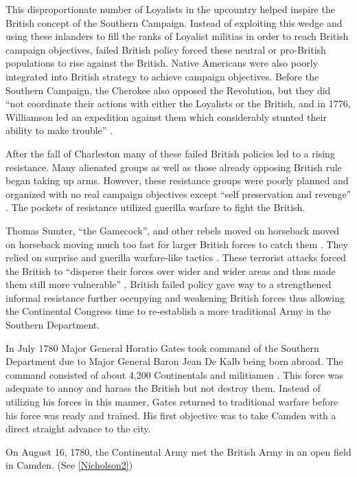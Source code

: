 This disproportionate number of Loyalists in the upcountry helped inspire the
British concept of the Southern Campaign.  Instead of exploiting this wedge and
using these inlanders to fill the ranks of Loyalist militias in order to reach
British campaign objectives, failed British policy forced these neutral or
pro-British populations to rise against the British.  Native Americans were also
poorly integrated into British strategy to achieve campaign objectives.  Before
the Southern Campaign, the Cherokee also opposed the Revolution, but they did
“not coordinate their actions with either the Loyalists or the British, and in
1776, Williamson led an expedition against them which considerably stunted their
ability to make trouble” \cite[p.12]{weigley_partisan_1970}.

After the fall of Charleston many of these failed British policies led to a
rising resistance.  Many alienated groups as well as those already opposing
British rule began taking up arms.  However, these resistance groups were poorly
planned and organized with no real campaign objectives except  “self
preservation and revenge” \cite[p.14]{weigley_partisan_1970}.  The pockets of resistance utilized
guerilla warfare to fight the British.  

Thomas Sumter, “the Gamecock”, and other rebels moved on horseback moved on
horseback moving much too fast for larger British forces to catch them
\cite[p.15]{weigley_partisan_1970}.  They relied on surprise and guerilla warfare-like tactics
\cite[p.15]{weigley_partisan_1970}.  These terrorist attacks forced the British to “disperse
their forces over wider and wider areas and thus made them still more
vulnerable” \cite[p.16]{weigley_partisan_1970}.  British failed policy gave way to a
strengthened informal resistance further occupying and weakening British forces
thus allowing the Continental Congress time to re-establish a more traditional
Army in the Southern
Department.

In July 1780 Major General Horatio Gates took command of the Southern Department
due to Major General Baron Jean De Kalb being born abroad.  The command
consisted of about 4,200 Continentals and militiamen \cite[p.21]{moncure_cowpens_1996}.  This
force was adequate to annoy and harass the British but not destroy them.
Instead of utilizing his forces in this manner, Gates returned to traditional
warfare before his force was ready and trained.  His first objective was to take
Camden with a direct straight advance to the city. 

On August 16, 1780, the Continental Army met the British Army in an open field
in Camden. (See \ref{Nicholson2})

